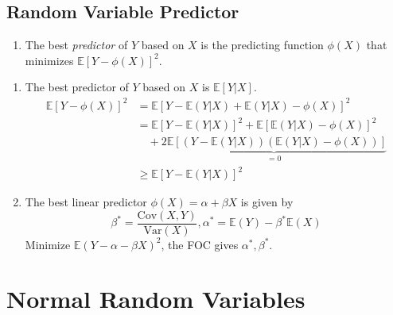 \documentclass[%
 aip,
 jmp,%
 amsmath,amssymb,
 reprint,%
]{revtex4-1}
\newenvironment{note}{\color{gray}\footnotesize}{}
\def\E{\mathbb{E}}
\def\Var{\mathrm{Var}}
\def\Cov{\mathrm{Cov}}
\begin{document}
\subsection{Random Variable Predictor}
\begin{enumerate}
    \item[] The best \emph{predictor} of $Y$ based on $X$ is the predicting
    function $\phi(X)$ that minimizes $\E[Y-\phi(X)]^2$.
\end{enumerate}
\begin{enumerate}
    \item The best predictor of $Y$ based on $X$ is $\E[Y|X]$.
        \begin{note}
            \begin{align*}
                \E[Y - \phi(X)]^2 &= \E[Y-\E(Y|X) + \E(Y|X) - \phi(X)]^2 \\
                    &= \E[Y-\E(Y|X)]^2 + \E[\E(Y|X) - \phi(X)]^2 \\
                    &\quad+ \underbrace{2\E[(Y-\E(Y|X))(\E(Y|X) - \phi(X))]}_{=0} \\
                    &\ge \E[Y-\E(Y|X)]^2
            \end{align*}
        \end{note}

    \item The best linear predictor $\phi(X)=\alpha + \beta X$ is given by
      $$ \beta^* = \frac{\Cov(X,Y)}{\Var(X)}, \alpha^* = \E(Y)-\beta^*\E(X) $$
        \begin{note}
            Minimize $\E(Y-\alpha-\beta X)^2$, the FOC gives $\alpha^*, \beta^*$.
        \end{note}
\end{enumerate}



\section{Normal Random Variables}
\end{document}
